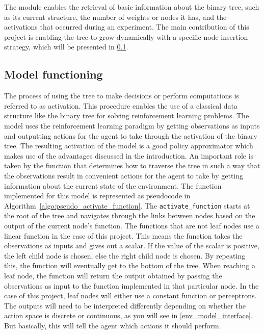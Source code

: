 The module enables the retrieval of basic information about the binary tree, such as its current structure, the number of weights or nodes it has, and the activations that occurred during an experiment. The main contribution of this project is enabling the tree to grow dynamically with a specific node insertion strategy, which will be presented in \ref{model_functioning}.

\subsection{Model functioning}
\label{model_functioning}

The process of using the tree to make decisions or perform computations is referred to as activation. This procedure enables the use of a classical data structure like the binary tree for solving reinforcement learning problems. The model uses the reinforcement learning paradigm by getting observations as inputs and outputting actions for the agent to take through the activation of the binary tree. The resulting activation of the model is a good policy approximator which makes use of the advantages discussed in the introduction. An important role is taken by the function that determines how to traverse the tree in such a way that the observations result in convenient actions for the agent to take by getting information about the current state of the environment. The function implemented for this model is represented as pseudocode in Algorithm~\ref{algo:pseudo_activate_function}. The \texttt{activate\_function} starts at the root of the tree and navigates through the links between nodes based on the output of the current node's function. The functions that are not leaf nodes use a linear function in the case of this project. This means the function takes the observations as inputs and gives out a scalar. If the value of the scalar is positive, the left child node is chosen, else the right child node is chosen. By repeating this, the function will eventually get to the bottom of the tree. When reaching a leaf node, the function will return the output obtained by passing the observations as input to the function implemented in that particular node. In the case of this project, leaf nodes will either use a constant function or perceptrons. The outputs will need to be interpreted differently depending on whether the action space is discrete or continuous, as you will see in \ref{env_model_interface}. But basically, this will tell the agent which actions it should perform.

